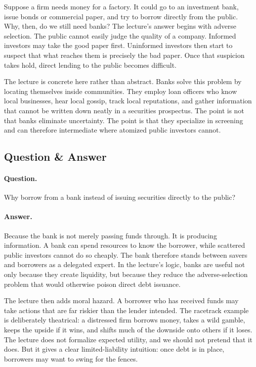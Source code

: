 Suppose a firm needs money for a factory. It could go to an investment bank, issue bonds or commercial paper, and try to borrow directly from the public. Why, then, do we still need banks? The lecture's answer begins with adverse selection. The public cannot easily judge the quality of a company. Informed investors may take the good paper first. Uninformed investors then start to suspect that what reaches them is precisely the bad paper. Once that suspicion takes hold, direct lending to the public becomes difficult.

The lecture is concrete here rather than abstract. Banks solve this problem by locating themselves inside communities. They employ loan officers who know local businesses, hear local gossip, track local reputations, and gather information that cannot be written down neatly in a securities prospectus. The point is not that banks eliminate uncertainty. The point is that they specialize in screening and can therefore intermediate where atomized public investors cannot.

\subsection{Question \& Answer}

\paragraph{Question.} Why borrow from a bank instead of issuing securities directly to the public?

\paragraph{Answer.} Because the bank is not merely passing funds through. It is producing information. A bank can spend resources to know the borrower, while scattered public investors cannot do so cheaply. The bank therefore stands between savers and borrowers as a delegated expert. In the lecture's logic, banks are useful not only because they create liquidity, but because they reduce the adverse-selection problem that would otherwise poison direct debt issuance.

The lecture then adds moral hazard. A borrower who has received funds may take actions that are far riskier than the lender intended. The racetrack example is deliberately theatrical: a distressed firm borrows money, takes a wild gamble, keeps the upside if it wins, and shifts much of the downside onto others if it loses. The lecture does not formalize expected utility, and we should not pretend that it does. But it gives a clear limited-liability intuition: once debt is in place, borrowers may want to swing for the fences.

